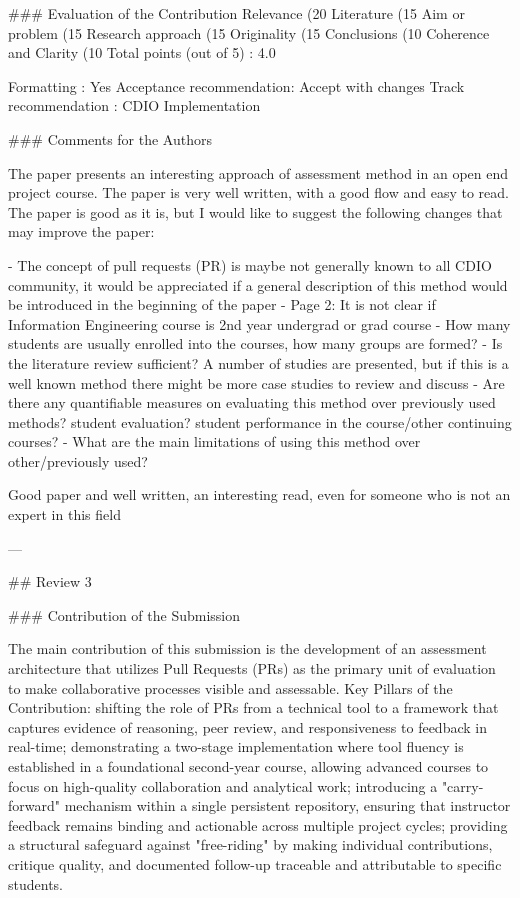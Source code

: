 ### Evaluation of the Contribution
Relevance (20%
Literature (15%
Aim or problem (15%
Research approach (15%
Originality (15%
Conclusions (10%
Coherence and Clarity (10%
Total points (out of 5) : 4.0

Formatting               : Yes  
Acceptance recommendation: Accept with changes  
Track recommendation     : CDIO Implementation  

### Comments for the Authors

The paper presents an interesting approach of assessment method in an open end project course. The paper is very well written, with a good flow and easy to read. The paper is good as it is, but I would like to suggest the following changes that may improve the paper:

- The concept of pull requests (PR) is maybe not generally known to all CDIO community, it would be appreciated if a general description of this method would be introduced in the beginning of the paper  
- Page 2: It is not clear if Information Engineering course is 2nd year undergrad or grad course  
- How many students are usually enrolled into the courses, how many groups are formed?  
- Is the literature review sufficient? A number of studies are presented, but if this is a well known method there might be more case studies to review and discuss  
- Are there any quantifiable measures on evaluating this method over previously used methods? student evaluation? student performance in the course/other continuing courses?  
- What are the main limitations of using this method over other/previously used?  

Good paper and well written, an interesting read, even for someone who is not an expert in this field

---

## Review 3

### Contribution of the Submission

The main contribution of this submission is the development of an assessment architecture that utilizes Pull Requests (PRs) as the primary unit of evaluation to make collaborative processes visible and assessable. Key Pillars of the Contribution: shifting the role of PRs from a technical tool to a framework that captures evidence of reasoning, peer review, and responsiveness to feedback in real-time; demonstrating a two-stage implementation where tool fluency is established in a foundational second-year course, allowing advanced courses to focus on high-quality collaboration and analytical work; introducing a "carry-forward" mechanism within a single persistent repository, ensuring that instructor feedback remains binding and actionable across multiple project cycles; providing a structural safeguard against "free-riding" by making individual contributions, critique quality, and documented follow-up traceable and attributable to specific students.

